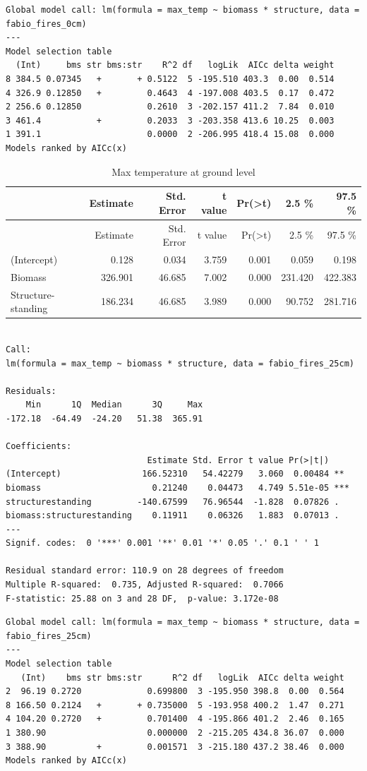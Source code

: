 \documentclass[11pt,a4paper]{article}
\begin{document}
\begin{verbatim}
Global model call: lm(formula = max_temp ~ biomass * structure, data = fabio_fires_0cm)
---
Model selection table 
  (Int)     bms str bms:str    R^2 df   logLik  AICc delta weight
8 384.5 0.07345   +       + 0.5122  5 -195.510 403.3  0.00  0.514
4 326.9 0.12850   +         0.4643  4 -197.008 403.5  0.17  0.472
2 256.6 0.12850             0.2610  3 -202.157 411.2  7.84  0.010
3 461.4           +         0.2033  3 -203.358 413.6 10.25  0.003
1 391.1                     0.0000  2 -206.995 418.4 15.08  0.000
Models ranked by AICc(x) 
\end{verbatim}

\begin{longtable}[]{@{}lrrrrrr@{}}
\caption{Max temperature at ground level}\tabularnewline
\toprule
& Estimate & Std. Error & t value &
Pr(\textgreater{}\textbar{}t\textbar{}) & 2.5 \% & 97.5
\%\tabularnewline
\midrule
\endfirsthead
\toprule
& Estimate & Std. Error & t value &
Pr(\textgreater{}\textbar{}t\textbar{}) & 2.5 \% & 97.5
\%\tabularnewline
\midrule
\endhead
(Intercept) & 0.128 & 0.034 & 3.759 & 0.001 & 0.059 &
0.198\tabularnewline
Biomass & 326.901 & 46.685 & 7.002 & 0.000 & 231.420 &
422.383\tabularnewline
Structure-standing & 186.234 & 46.685 & 3.989 & 0.000 & 90.752 &
281.716\tabularnewline
\bottomrule
\end{longtable}

\begin{verbatim}

Call:
lm(formula = max_temp ~ biomass * structure, data = fabio_fires_25cm)

Residuals:
    Min      1Q  Median      3Q     Max 
-172.18  -64.49  -24.20   51.38  365.91 

Coefficients:
                            Estimate Std. Error t value Pr(>|t|)    
(Intercept)                166.52310   54.42279   3.060  0.00484 ** 
biomass                      0.21240    0.04473   4.749 5.51e-05 ***
structurestanding         -140.67599   76.96544  -1.828  0.07826 .  
biomass:structurestanding    0.11911    0.06326   1.883  0.07013 .  
---
Signif. codes:  0 '***' 0.001 '**' 0.01 '*' 0.05 '.' 0.1 ' ' 1

Residual standard error: 110.9 on 28 degrees of freedom
Multiple R-squared:  0.735, Adjusted R-squared:  0.7066 
F-statistic: 25.88 on 3 and 28 DF,  p-value: 3.172e-08
\end{verbatim}

\begin{verbatim}
Global model call: lm(formula = max_temp ~ biomass * structure, data = fabio_fires_25cm)
---
Model selection table 
   (Int)    bms str bms:str      R^2 df   logLik  AICc delta weight
2  96.19 0.2720             0.699800  3 -195.950 398.8  0.00  0.564
8 166.50 0.2124   +       + 0.735000  5 -193.958 400.2  1.47  0.271
4 104.20 0.2720   +         0.701400  4 -195.866 401.2  2.46  0.165
1 380.90                    0.000000  2 -215.205 434.8 36.07  0.000
3 388.90          +         0.001571  3 -215.180 437.2 38.46  0.000
Models ranked by AICc(x) 
\end{verbatim}
\end{document}
